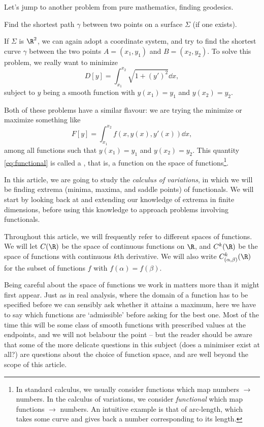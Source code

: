 Let's jump to another problem from pure mathematics, finding geodesics.

\begin{example}
	Find the shortest path $\gamma$ between two points on a surface $\Sigma$ (if one exists).
\end{example}


If $\Sigma$ is $\R^2$, we can again adopt a coordinate system, and try to find the shortest curve $\gamma$ between the two points $A = (x_1, y_1)$ and $B=(x_2, y_2)$.
To solve this problem, we really want to minimize
$$
D[y] = \int_{x_1}^{x_2} \sqrt{1 + (y')^2} \dd{x},
$$
subject to $y$ being a smooth function with $y(x_1) = y_1$ and $y(x_2) = y_2$.

Both of these problems have a similar flavour: we are trying the minimize or maximize something like
\begin{equation}\label{eq:functional}
	F[y] = \int_{x_1}^{x_2} f(x, y(x), y'(x)) \dd x, \tag{$*$}
\end{equation}
among all functions such that $y(x_1) = y_1$ and $y(x_2) = y_2$.
This quantity \eqref{eq:functional} is called a , that is, a function on the space of functions\footnote{In standard calculus, we usually consider functions which map numbers $\rightarrow$ numbers. In the calculus of variations, we consider \emph{functional} which map functions $\rightarrow$ numbers. An intuitive example is that of arc-length, which takes some curve and gives back a number corresponding to its length.}.

In this article, we are going to study the \emph{calculus of variations}, in which we will be finding extrema (minima, maxima, and saddle points) of functionals. 
We will start by looking back at and extending our knowledge of extrema in finite dimensions, before using this knowledge to approach problems involving functionals.

\begin{notation}
	Throughout this article, we will frequently refer to different spaces of functions. We will let $C(\R)$ be the space of continuous functions on $\R$, and $C^k(\R)$ be the space of functions with continuous $k$th derivative. We will also write $C_{(\alpha, \beta)}^k(\R)$ for the subset of functions $f$ with $f(\alpha) = f(\beta)$.
\end{notation}

Being careful about the space of functions we work in matters more than it might first appear. Just as in real analysis, where the domain of a function has to be specified before we can sensibly ask whether it attains a maximum, here we have to say which functions are `admissible' before asking for the best one. Most of the time this will be some class of smooth functions with prescribed values at the endpoints, and we will not belabour the point -- but the reader should be aware that some of the more delicate questions in this subject (does a minimiser exist at all?) are questions about the choice of function space, and are well beyond the scope of this article.

